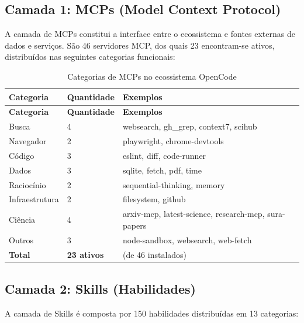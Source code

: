 \documentclass[
  brazil,
  sumario=tradicional,
  10pt
]{abntex2}
\begin{document}
\subsection{Camada 1: MCPs (Model Context Protocol)}

A camada de MCPs constitui a interface entre o ecossistema e fontes
externas de dados e serviços. São 46 servidores MCP, dos quais 23
encontram-se ativos, distribuídos nas seguintes categorias funcionais:

\begin{longtable}{p{3cm}p{3.5cm}p{5.5cm}}
  \caption{Categorias de MCPs no ecossistema OpenCode}
  \label{tab:mcps}\\
  \toprule
  \textbf{Categoria} & \textbf{Quantidade} & \textbf{Exemplos} \\
  \midrule
  \endfirsthead
  \toprule
  \textbf{Categoria} & \textbf{Quantidade} & \textbf{Exemplos} \\
  \midrule
  \endhead
  \bottomrule
  \endfoot
  Busca             & 4  & websearch, gh\_grep, context7, scihub \\
  Navegador         & 2  & playwright, chrome-devtools \\
  Código            & 3  & eslint, diff, code-runner \\
  Dados             & 3  & sqlite, fetch, pdf, time \\
  Raciocínio        & 2  & sequential-thinking, memory \\
  Infraestrutura    & 2  & filesystem, github \\
  Ciência           & 4  & arxiv-mcp, latest-science, research-mcp, sura-papers \\
  Outros            & 3  & node-sandbox, websearch, web-fetch \\
  \hline
  \textbf{Total}    & \textbf{23 ativos} & (de 46 instalados) \\
\end{longtable}

\subsection{Camada 2: Skills (Habilidades)}

A camada de Skills é composta por 150 habilidades distribuídas em
13 categorias:
\end{document}
